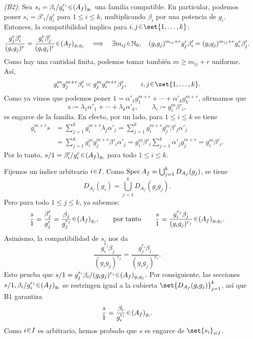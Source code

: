 \begin{sol}
\medskip
\noindent\emph{(B2)}: Sea $s_i=\beta_i/g_i^{r_i}\en(A_f)_{g_i}$ una familia compatible. En particular, podemos poner $s_i=\beta'_i/g_i^r$ para $1\le i\le k$, multiplicando $\beta_i$ por una potencia de $g_i$. Entonces, la compatibilidad implica para $i,j\en\set{1,\ldots,k}$:
\[
\frac{g_j^r\beta'_i}{(g_i g_j)^r}=\frac{g_i^r\beta'_j}{(g_i g_j)^r}\en(A_f)_{g_i g_j}
\quad\Longrightarrow\quad
\exists m_{ij}\en\mathbb N_0,\quad
(g_i g_j)^{m_{ij}+r}g_j^r\beta'_i=(g_i g_j)^{m_{ij}+r}g_i^r\beta'_j.
\]
Como hay una cantidad finita, podemos tomar también $m\ge m_{ij}+r$ uniforme. Así,
\[
g_i^m g_j^{m+r}\beta'_i=g_j^m g_i^{m+r}\beta'_j,
\qquad i,j\en\set{1,\ldots,k}.
\]
Como ya vimos que podemos poner $1=\alpha'_1g_1^{m+r}+\cdots+\alpha'_k g_k^{m+r}$, afirmamos que
\[
s\coloneq\lambda_1\alpha'_1+\cdots+\lambda_k\alpha'_k,
\qquad\lambda_i\coloneq g_i^m\beta'_i,
\]
es engarce de la familia. En efecto, por un lado, para $1\le i\le k$ se tiene
\[
\begin{aligned}
g_i^{m+r}s
&=\sum_{j=1}^k g_i^{m+r}\lambda_j\alpha'_j
=\sum_{j=1}^k g_i^{m+r}g_j^m\beta'_j\alpha'_j\\
&=\sum_{j=1}^k g_i^m g_j^{m+r}\beta'_i\alpha'_j
=g_i^m\beta'_i\sum_{j=1}^k\alpha'_j g_j^{m+r}
=g_i^m\beta'_i.
\end{aligned}
\]
Por lo tanto, $s/1=\beta'_i/g_i^r\en(A_f)_{g_i}$ para todo $1\le i\le k$.

Fijemos un índice arbitrario $i\en I$. Como $\operatorname{Spec} A_f=\bigcup_{j=1}^kD_{A_f}(g_j)$, se tiene
\[
D_{A_f}(g_i)=\bigcup_{j=1}^kD_{A_f}(g_i g_j).
\]
Pero para todo $1\le j\le k$, ya sabemos:
\[
\frac{s}{1}=\frac{\beta'_j}{g_j^r}=\frac{\beta_j}{g_j^{r_j}}\en(A_f)_{g_j},
\qquad\text{por tanto}\qquad
\frac{s}{1}=\frac{g_i^{r_j}\beta_j}{(g_i g_j)^{r_j}}\en(A_f)_{g_i g_j}.
\]
Asimismo, la compatibilidad de $s_i$ nos da
\[
\frac{g_i^{r_j}\beta_j}{(g_i g_j)^{r_j}}
=\frac{g_j^{r_i}\beta_i}{(g_i g_j)^{r_i}}.
\]
Esto prueba que $s/1=g_j^{r_i}\beta_i/(g_i g_j)^{r_i}\en(A_f)_{g_i g_j}$. Por consiguiente, las secciones $s/1,\beta_i/g_i^{r_i}\en(A_f)_{g_i}$ se restringen igual a la cubierta $\set{D_{A_f}(g_i g_j)}_{j=1}^k$, así que B1 garantiza
\[
\frac{s}{1}=\frac{\beta_i}{g_i^{r_i}}\en(A_f)_{g_i}.
\]
Como $i\en I$ es arbitrario, hemos probado que $s$ es engarce de $\set{s_i}_{i\en I}$.
\end{sol}
